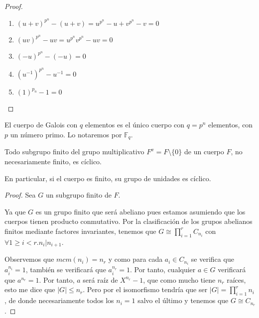 \begin{proof}
\begin{enumerate}
\item $(u+v)^{p^n} - (u+v) = u^{p^n}-u+v^{p^n}-v = 0$
\item $(uv)^{p^n}-uv = u^{p^n}v^{p^n} - uv = 0$
\item $(-u)^{p^n} - (-u) = 0$
\item $(u^{-1})^{p^n} - u^{-1} = 0$
\item $(1)^{p_n} - 1 = 0$
\end{enumerate}
\end{proof}

\begin{definition}
El cuerpo de Galois con $q$ elementos es el único cuerpo con $q = p^n$ elementos, con $p$ un número primo. Lo notaremos por $\mathbb{F}_q$. 
\end{definition}

\begin{proposition}
	Todo subgrupo finito del grupo multiplicativo $F^x = F \setminus \{0\}$ de un cuerpo $F$, no necesariamente finito, es cíclico.
	
	En particular, si el cuerpo es finito, su grupo de unidades es cíclico. 
\end{proposition}
\begin{proof}
	Sea $G$ un subgrupo finito de $F$. 
	
	Ya que $G$ es un grupo finito que será abeliano pues estamos asumiendo que los cuerpos tienen producto conmutativo. Por la clasificación de los grupos abelianos finitos mediante factores invariantes, tenemos que $G \cong \prod_{i = 1}^r C_{n_i}$ con $\forall 1 \ge i < r. n_i|n_{i+1}$.
	
	Observemos que $mcm(n_i) = n_r$ y como para cada $a_i \in C_{n_i}$ se verifica que $a_i^{n_i} = 1$, también se verificará que $a_i^{n_r} = 1$. Por tanto, cualquier $a \in G$ verificará que $a^{n_r} = 1$. Por tanto, $a$ será raíz de $X^{n_r}-1$, que como mucho tiene $n_r$ raíces, esto me dice que $|G| \le n_r$. Pero por el isomorfismo tendría que ser $|G| = \prod_{i = 1}^r n_i$, de donde necesariamente todos los $n_i = 1$ salvo el último y tenemos que $G \cong C_{n_r}$. 
\end{proof}

